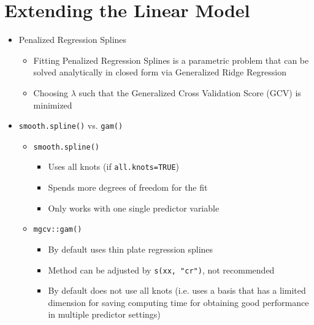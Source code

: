 \documentclass[a4paper]{article}
\begin{document}
\section{Extending the Linear Model}
\begin{itemize}
    \item Penalized Regression Splines
    \begin{itemize}
        \item Fitting Penalized Regression Splines is a parametric problem that can be solved analytically in closed form via Generalized Ridge Regression
        \item Choosing $\lambda$ such that the Generalized Cross Validation Score (GCV) is minimized
    \end{itemize}
    \item \texttt{smooth.spline()} vs. \texttt{gam()}
    \begin{itemize}
        \item \texttt{smooth.spline()}
        \begin{itemize}
            \item Uses all knots (if \texttt{all.knots=TRUE})
            \item Spends more degrees of freedom for the fit
            \item Only works with one single predictor variable
        \end{itemize}
        \item \texttt{mgcv::gam()}
        \begin{itemize}
            \item By default uses thin plate regression splines
            \item Method can be adjusted by \texttt{s(xx, "cr")}, not recommended
            \item By default does not use all knots (i.e. uses a basis that has a limited dimension for saving computing time for obtaining good performance in multiple predictor settings)
        \end{itemize}
    \end{itemize}
\end{itemize}
\end{document}
